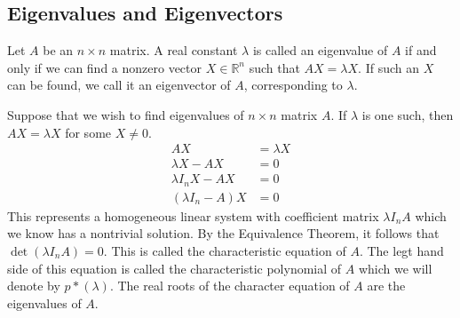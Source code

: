 \documentclass[12pt]{article}
\begin{document}
\subsection{Eigenvalues and Eigenvectors} 
\begin{definition} Let $A$ be an $n \times n$ matrix. A real constant $\lambda$ is called an eigenvalue of $A$ if and only if we can find a nonzero vector $X \in \mathbb{R}^n$ such that $AX = \lambda X$. If such an $X$ can be found, we call it an eigenvector of $A$, corresponding to $\lambda$. \end{definition} 
Suppose that we wish to find eigenvalues of $n \times n$ matrix $A$. If $\lambda$ is one such, then $AX = \lambda X$ for some $X \neq 0$. $$\begin{aligned} AX &= \lambda X \\ \lambda X - AX &= 0 \\ \lambda I_nX - AX &= 0 \\ (\lambda I_n - A)X &= 0 \end{aligned} $$ This represents a homogeneous linear system with coefficient matrix $\lambda I_nA$ which we know has a nontrivial solution. By the Equivalence Theorem, it follows that $\det(\lambda I_nA) = 0$. This is called the characteristic equation of $A$. The legt hand side of this equation is called the characteristic polynomial of $A$ which we will denote by $p*(\lambda)$. \newline The real roots of the character equation of $A$ are the eigenvalues of $A$. 
\end{document}
